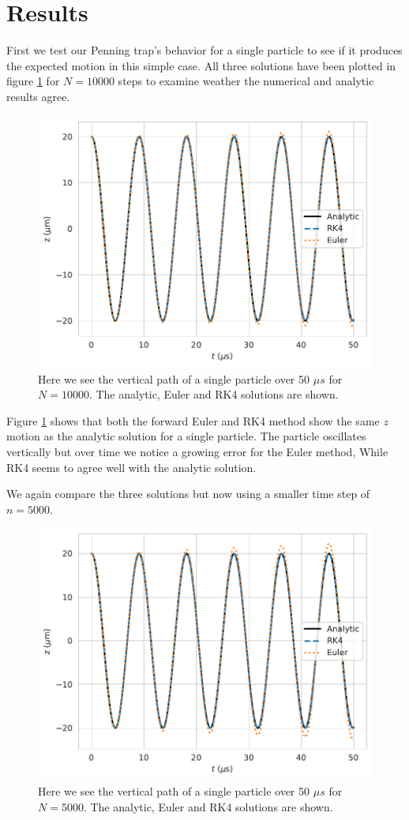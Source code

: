 \documentclass[english,notitlepage,reprint,nofootinbib]{revtex4-1}  %
\begin{document}
\section{Results}\label{sec:results}
First we test our Penning trap's behavior for a single particle to see if it produces the expected motion in this simple case.
All three solutions have been plotted in figure \ref{fig:compare_analytic_tz} for $N=10000$ steps to examine weather the numerical and analytic results agree.
\begin{figure}[H]
    \centering
    \includegraphics[width=.5\textwidth]{../figures/compare_analytic_t_axis_2_N10000.pdf}
    \caption{Here we see the vertical path of a single particle over 50 $\mu s$ for $N=10000$. The analytic, Euler and RK4 solutions are shown.}
    \label{fig:compare_analytic_tz}
\end{figure}
Figure \ref{fig:compare_analytic_tz} shows that both the forward Euler and RK4 method show the same
$z$ motion as the analytic solution for a single particle. The particle oscillates vertically but over time we notice a growing error for the Euler method, While RK4 seems to agree well with the analytic solution.

We again compare the three solutions but now using a smaller time step of $n=5000$.
\begin{figure}[H]
    \centering
    \includegraphics[width=.5\textwidth]{../figures/compare_analytic_t_axis_2_N5000.pdf}
    \caption{Here we see the vertical path of a single particle over 50 $\mu s$ for $N=5000$. The analytic, Euler and RK4 solutions are shown.}
    \label{fig:compare_analytic_tz_5000}
\end{figure}
\end{document}
